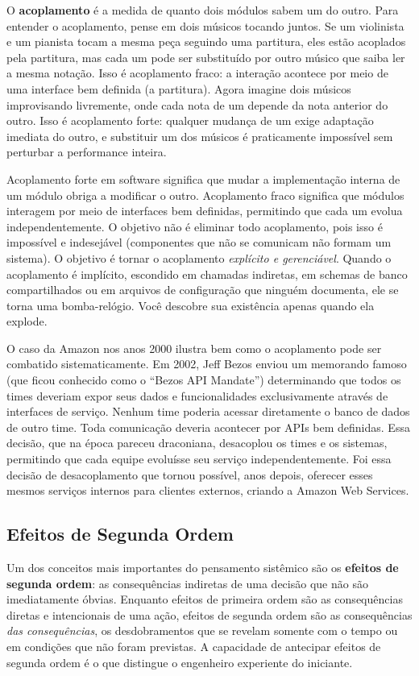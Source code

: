 O \textbf{acoplamento} é a medida de quanto dois módulos sabem um do
outro. Para entender o acoplamento, pense em dois músicos tocando juntos.
Se um violinista e um pianista tocam a mesma peça seguindo uma partitura,
eles estão acoplados pela partitura, mas cada um pode ser substituído
por outro músico que saiba ler a mesma notação. Isso é acoplamento fraco:
a interação acontece por meio de uma interface bem definida (a partitura).
Agora imagine dois músicos improvisando livremente, onde cada nota de um
depende da nota anterior do outro. Isso é acoplamento forte: qualquer
mudança de um exige adaptação imediata do outro, e substituir um dos
músicos é praticamente impossível sem perturbar a performance inteira.

Acoplamento forte em software significa que mudar a implementação interna
de um módulo obriga a modificar o outro. Acoplamento fraco significa que
módulos interagem por meio de interfaces bem definidas, permitindo que
cada um evolua independentemente. O objetivo não é eliminar todo
acoplamento, pois isso é impossível e indesejável (componentes que
não se comunicam não formam um sistema). O objetivo é tornar o acoplamento
\emph{explícito e gerenciável}. Quando o acoplamento é implícito,
escondido em chamadas indiretas, em schemas de banco compartilhados ou
em arquivos de configuração que ninguém documenta, ele se torna uma
bomba-relógio. Você descobre sua existência apenas quando ela explode.

O caso da Amazon nos anos 2000 ilustra bem como o acoplamento pode ser
combatido sistematicamente. Em 2002, Jeff Bezos enviou um memorando famoso
(que ficou conhecido como o ``Bezos API Mandate'') determinando que todos
os times deveriam expor seus dados e funcionalidades exclusivamente
através de interfaces de serviço. Nenhum time poderia acessar diretamente
o banco de dados de outro time. Toda comunicação deveria acontecer por
APIs bem definidas. Essa decisão, que na época pareceu draconiana,
desacoplou os times e os sistemas, permitindo que cada equipe evoluísse
seu serviço independentemente. Foi essa decisão de desacoplamento que
tornou possível, anos depois, oferecer esses mesmos serviços internos
para clientes externos, criando a Amazon Web Services.

\subsection{Efeitos de Segunda Ordem}

Um dos conceitos mais importantes do pensamento sistêmico são os
\textbf{efeitos de segunda ordem}: as consequências indiretas de uma
decisão que não são imediatamente óbvias. Enquanto efeitos de primeira
ordem são as consequências diretas e intencionais de uma ação, efeitos
de segunda ordem são as consequências \emph{das consequências}, os
desdobramentos que se revelam somente com o tempo ou em condições que
não foram previstas. A capacidade de antecipar efeitos de segunda ordem
é o que distingue o engenheiro experiente do iniciante.

